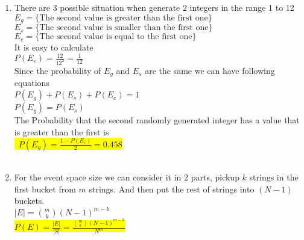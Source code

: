 \documentclass{article}
\begin{document}
\begin{enumerate}
\begin{enumerate}
	\end{enumerate}
	\item
	\begin{enumerate}
		\mysolu
		There are 3 possible situation when generate 2 integers in the range 1 to 12\\
		${E_g = \{\text{The second value is greater than the first one}\}}$\\
		${E_s = \{\text{The second value is smaller than the first one}\}}$\\
		${E_e = \{\text{The second value is equal to the first one}\}}$\\
		It is easy to calculate\\
		${P(E_e)=\frac{12}{12^2}=\frac{1}{12}}$\\
		Since the probability of ${E_g}$ and ${E_s}$ are the same we can have following equations\\
		${P(E_g)+P(E_s)+P(E_e) = 1}$\\
		${P(E_g)=P(E_s)}$\\
		\myansw
		The Probability that the second randomly generated integer has a value that is greater than the first is\\
		\colorbox{yellow}{\
			${P(E_g)= \frac{1-P(E_e)}{2}=0.458}$\\
		}\\
	\end{enumerate}
	\item
	\begin{enumerate}
		\mysolu
		For the event space size we can consider it in 2 parts, pickup ${k}$ strings in the first bucket from ${m}$ strings. And then put the rest of strings into $(N-1)$ buckets.\\
		${|E| = {m \choose k}(N-1)^{m-k}}$\\
		\myansw
		\colorbox{yellow}{
			${P(E)=\frac{|E|}{|S|}=\frac{{m \choose k}(N-1)^{m-k}}{N^m}}$
		}\\
		
	\end{enumerate}

	
	


\end{enumerate}

\newpage
\end{document}
